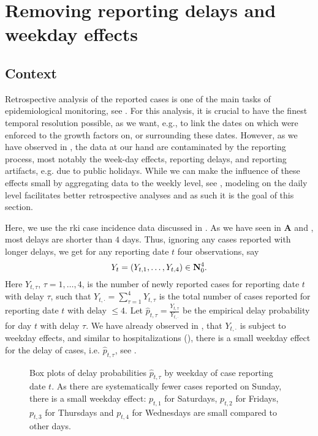 \section{Removing reporting delays and weekday effects}%
\label{sec:model_reporting_delay}
\subsection{Context}
Retrospective analysis of the reported cases is one of the main tasks of epidemiological monitoring, see . For this analysis, it is crucial to have the finest temporal resolution possible, as we want, e.g., to link the dates on which  were enforced to the growth factors on, or surrounding these dates. However, as we have observed in , the data at our hand are contaminated by the reporting process, most notably the week-day effects, reporting delays, and reporting artifacts, e.g. due to public holidays.
While we can make the influence of these effects small by aggregating data to the weekly level, see , modeling on the daily level facilitates better retrospective analyses and as such it is the goal of this section.

Here, we use the \acrshort{rki} case incidence data discussed in . As we have seen in  \textbf{A} and , most delays are shorter than $4$ days. Thus, ignoring any cases reported with longer delays, we get for any reporting date $t$ four observations, say 
$$
    Y_{t} = \left( Y_{t, 1}, \dots, Y_{t, 4} \right) \in \mathbf N^{4}_{0}.
$$
Here $Y_{t,\tau}$, $\tau = 1, \dots, 4$, is the number of newly reported cases for reporting date $t$ with delay $\tau$, such that $Y_{t,\cdot} = \sum_{\tau = 1}^4 Y_{t, \tau}$ is the total number of cases reported for reporting date $t$ with delay $\leq 4$. 
Let $\hat p_{t, \tau} = \frac{Y_{t,\tau}}{Y_{t,\cdot}}$ be the empirical delay probability for day $t$ with delay $\tau$. We have already observed in , that $Y_{t, \cdot}$ is subject to weekday effects, and similar to hospitalizations (), there is a small weekday effect for the delay of cases, i.e. $\hat p_{t,\tau}$, see . 

\begin{figure}
    \resizebox{\textwidth}{!}{%
    }
    \caption{Box plots of delay probabilities $\hat p_{t,\tau}$ by weekday of case reporting date $t$. As there are systematically fewer cases reported on Sunday, there is a small weekday effect: $p_{t,1}$ for Saturdays, $p_{t,2}$ for Fridays, $p_{t,3}$ for Thursdays and $p_{t,4}$ for Wednesdays are small compared to other days.}
    \label{fig:weekday_effect_delays}
\end{figure}

